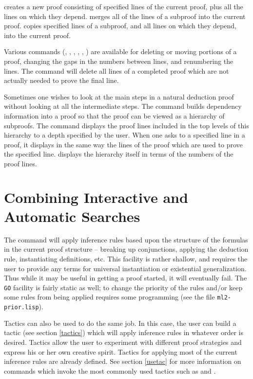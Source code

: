  creates a new proof consisting of specified lines of
the current proof, plus all the lines on which they depend.
 merges all of the lines of a subproof into the current
proof.   copies specified lines of a subproof, and all
lines on which they depend, into the current proof.

Various commands (, , 
, ,
, ) are 
available for deleting or moving portions of
a proof, changing the gaps in the numbers between lines, and
renumbering the lines.  The  command will delete all lines of a
completed proof which are not actually needed to prove the final line.

Sometimes one wishes to look at the main steps in a natural deduction
proof without looking at all the intermediate steps.  The command
 builds dependency information into a proof so
that the proof can be viewed as a hierarchy of subproofs.  The command
 displays the proof lines included in the top levels of this
hierarchy to a depth specified by the user.  When one asks {\TPS} to
 a specified line in a proof, it displays in the same way the
lines of the proof which are used to prove the specified line.
 displays the hierarchy itself in terms of the
numbers of the proof lines.


\section{Combining Interactive and Automatic Searches}

The command  will apply inference rules based
upon the structure of the formulas in the current proof structure --
breaking up conjunctions, applying the deduction rule, instantiating
definitions, etc.  This facility is rather shallow, and requires the user to
provide any terms for universal instantiation or existential generalization.
Thus while it may be useful in getting a proof started, it will
eventually fail.  The {\tt GO} facility is fairly static as well; to change
the priority of the rules and/or keep some rules from being applied requires
some programming (see the file {\tt ml2-prior.lisp}).

Tactics can also be used to do the same job.  In this case, the user can
build a tactic (see section \ref{tactics}) which will apply inference rules
in whatever order is desired.  Tactics allow the user to experiment with
different proof strategies and express his or her own creative spirit.
Tactics for applying most of the current inference rules are already defined.
See section \ref{usetac} for more information on commands which invoke
the most commonly used tactics
such as  and .

